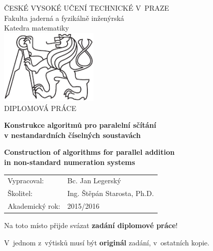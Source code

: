 \documentclass[a4paper, 11pt, twoside, openright]{report}
\theoremstyle{definition}
\newcommand{\cvut}{ČESKÉ VYSOKÉ UČENÍ TECHNICKÉ V~PRAZE}
\newcommand{\fjfi}{Fakulta jaderná a fyzikálně inženýrská}
\newcommand{\km}{Katedra matematiky}
\newcommand{\nazevczBreaked}{Konstrukce algoritm\r u pro paraleln\'i s\v c\'it\'an\'i \\[8pt] v nestandardn\'ich \v c\'iseln\'ych soustav\'ach}
\newcommand{\nazevenBreaked}{Construction of algorithms for parallel addition  \\[8pt] in non-standard numeration systems}
\newcommand{\autor}{Jan Legersk\'y}
\newcommand{\autorBc}{Bc. Jan Legersk\'y}
\newcommand{\vedouci}{Ing. \v St\v ep\'an Starosta, Ph.D.}
\begin{document}
\begin{titlepage}
%


\thispagestyle{empty}
\begin{center}
	{\Large \cvut \\[10pt] \fjfi \\[10pt] \km\\}
	\vspace{45pt} %
	\includegraphics[height=100pt]{img/logoCVUT.pdf}\\
	\vspace{90pt}
	{\Large DIPLOMOV\'A PR\'ACE}
	\vspace{90pt}
	
	{\Large\bf \nazevczBreaked}
	\vspace{30pt}
	
	{\Large\bf \nazevenBreaked}
\end{center}
\vfill
{
	\Large
	\begin{tabular}{ll}
	Vypracoval: & \autorBc\\[3pt]
	\v Skolitel: & \vedouci\\[3pt]
	Akademick\'y rok: & 2015/2016
	\end{tabular}
}
\cleardoublepage
\thispagestyle{empty}

 \thispagestyle{empty}
 \Large
 Na toto místo přijde svázat \textbf{zadání diplomové práce}!
 
 \vspace{4mm}
 V~jednom z~výtisků musí být \textbf{originál} zadání, v~ostatních kopie.
 \normalsize
\cleardoublepage


\end{titlepage}
\end{document}
